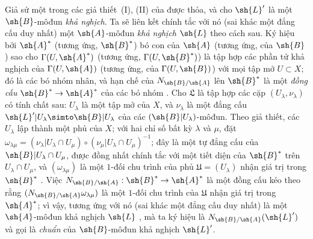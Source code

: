 \documentclass[oneside,10pt]{amsart}
\makeatletter
\newcommand{\ega@arrow}[2]{\mathchoice{#1}{#2}{#2}{#2}}
\renewcommand{\to}{\ega@arrow{\longrightarrow}{\rightarrow}}
\newcommand{\oldpage}[2][]{\marginnote{\normalfont\footnotesize\textbf{#1}~|~#2}\ignorespaces}
\let\EGAOriginalLabel\label
\renewcommand{\label}[1]{\phantomsection\EGAOriginalLabel{#1}}
\makeatother
\begin{document}
\begin{env}[6.5.2]
\label{II.6.5.2}
Giả sử một trong các giả thiết~(I), (II) của  được thỏa, và cho $\sh{L}'$ là một $\sh{B}$-môđun \emph{khả nghịch}.
Ta sẽ liên kết chính tắc với nó (sai khác một đẳng cấu duy nhất) một $\sh{A}$-môđun \emph{khả nghịch} $\sh{L}$ theo cách sau.
Ký hiệu bởi $\sh{A}^*$ (tương ứng, $\sh{B}^*$) bó con của $\sh{A}$ (tương ứng, của $\sh{B}$) sao cho $\Gamma(U,\sh{A}^*)$ (tương ứng, $\Gamma(U,\sh{B}^*)$) là tập hợp các
\oldpage[II]{127}
phần tử khả nghịch của $\Gamma(U,\sh{A})$ (tương ứng, của $\Gamma(U,\sh{B})$) với mọi tập mở $U\subset X$;
đó là các bó nhóm nhân, và hạn chế của $N_{\sh{B}/\sh{A}}$ lên $\sh{B}^*$ là một \emph{đồng cấu} $\sh{B}^*\to\sh{A}^*$ của các bó nhóm .
Cho $\mathfrak{L}$ là tập hợp các cặp $(U_\lambda,\nu_\lambda)$ có tính chất sau: $U_\lambda$ là một tập mở của $X$, và $\nu_\lambda$ là một đẳng cấu $\sh{L}'|U_\lambda\simto\sh{B}|U_\lambda$ của các $(\sh{B}|U_\lambda)$-môđun.
Theo giả thiết, các $U_\lambda$ lập thành một phủ của $X$;
với hai chỉ số bất kỳ $\lambda$ và $\mu$, đặt $\omega_{\lambda\mu}=(\nu_\lambda|U_\lambda\cap U_\mu)\circ(\nu_\mu|U_\lambda\cap U_\mu)^{-1}$; đây là một tự đẳng cấu của $\sh{B}|U_\lambda\cap U_\mu$, được đồng nhất chính tắc với một tiết diện của $\sh{B}^*$ trên $U_\lambda\cap U_\mu$, và $(\omega_{\lambda\mu})$ là một $1$-đối chu trình của phủ $\mathfrak{U}=(U_\lambda)$ nhận giá trị trong $\sh{B}^*$ .
Việc $N_{\sh{B}/\sh{A}}:\sh{B}^*\to\sh{A}^*$ là một đồng cấu kéo theo rằng $(N_{\sh{B}/\sh{A}}\omega_{\lambda\mu})$ là một $1$-đối chu trình của $\mathfrak{U}$ nhận giá trị trong $\sh{A}^*$; vì vậy, tương ứng với nó (sai khác một đẳng cấu duy nhất) là một $\sh{A}$-môđun khả nghịch $\sh{L}$ , mà ta ký hiệu là $N_{\sh{B}/\sh{A}}(\sh{L}')$ và gọi là \emph{chuẩn} của $\sh{B}$-môđun khả nghịch $\sh{L}'$.


\end{env}
\end{document}
